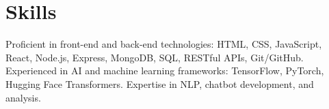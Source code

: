 \documentclass[a4paper,12pt]{article}
\begin{document}


\section{Skills}

Proficient in front-end and back-end technologies: HTML, CSS, JavaScript, React, Node.js, Express, MongoDB, SQL, RESTful APIs, Git/GitHub. Experienced in AI and machine learning frameworks: TensorFlow, PyTorch, Hugging Face Transformers. Expertise in NLP, chatbot development, and analysis.



\end{document}
